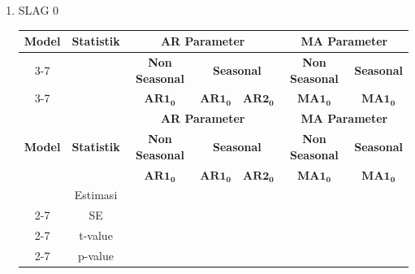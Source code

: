 \begin{enumerate}[label=\alph*.]
    \item SLAG 0
        \scriptsize
        \begin{longtable}{|c|c|c|c|c|c|c|}
            \hline
            \multirow{3}{*}{\textbf{Model}} &
            \multirow{3}{*}{\textbf{Statistik}} &
            \multicolumn{3}{|c|}{\textbf{AR Parameter}} &
            \multicolumn{2}{|c|}{\textbf{MA Parameter}} \\ \cline{3-7}

            & &
            \multicolumn{1}{|c|}{\textbf{Non Seasonal}} &
            \multicolumn{2}{|c|}{\textbf{Seasonal}} &
            \multicolumn{1}{|c|}{\textbf{Non Seasonal}} &
            \textbf{Seasonal} \\ \cline{3-7}

            & &
            $\mathbf{AR1_0}$ &
            $\mathbf{AR1_0}$ &
            $\mathbf{AR2_0}$ &
            $\mathbf{MA1_0}$ &
            $\mathbf{MA1_0}$ \\ 
            \hline
            \endfirsthead

            \hline
            \multirow{3}{*}{\textbf{Model}} &
            \multirow{3}{*}{\textbf{Statistik}} &
            \multicolumn{3}{|c|}{\textbf{AR Parameter}} &
            \multicolumn{2}{|c|}{\textbf{MA Parameter}} \\ \cline{3-7}
            & &
            \multicolumn{1}{|c|}{\textbf{Non Seasonal}} &
            \multicolumn{2}{|c|}{\textbf{Seasonal}} &
            \multicolumn{1}{|c|}{\textbf{Non Seasonal}} &
            \textbf{Seasonal} \\ \cline{3-7}
            & &
            $\mathbf{AR1_0}$ &
            $\mathbf{AR1_0}$ &
            $\mathbf{AR2_0}$ &
            $\mathbf{MA1_0}$ &
            $\mathbf{MA1_0}$ \\ 
            \hline
            \endhead

            \hline
            \endfoot
            \hline
            \endlastfoot

            \multirow{4}{*}{$(0,0,0)\times(0,1,0)_{12}$}
            & Estimasi &  &  &  &  &  \\ \cline{2-7}
            & SE       &  &  &  &  &  \\ \cline{2-7}
            & t-value  &  &  &  &  &  \\ \cline{2-7}
            & p-value  &  &  &  &  &  \\ \hline


\end{longtable}
\end{enumerate}
